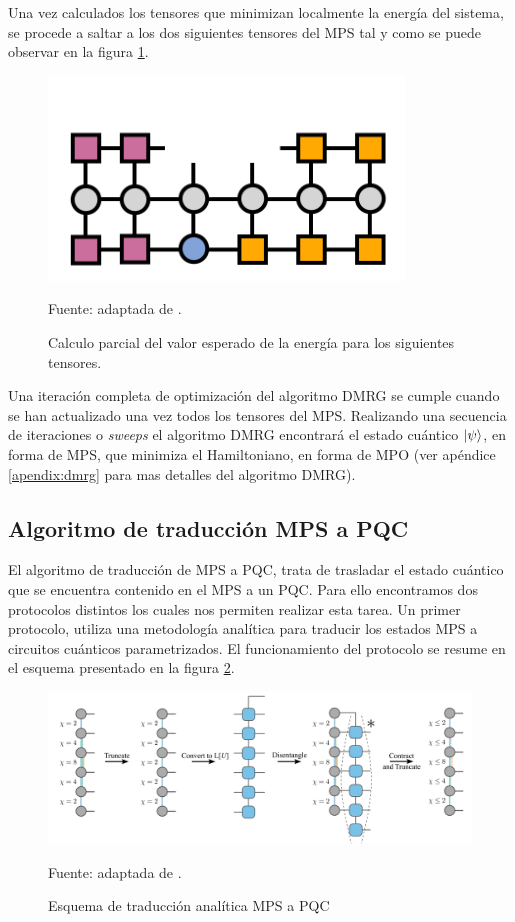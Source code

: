 Una vez calculados los tensores que minimizan localmente la energía del sistema, se procede a saltar a los dos siguientes tensores del MPS tal y como se puede observar en la figura \ref{fig:mpo_mps_2}.

\begin{figure}[!h]
    \centering
    \includegraphics[scale = 0.8]{img/05-dmrg_mpo_mps_2.png}
    \caption{Calculo parcial del valor esperado de la energía para los siguientes tensores.}
    Fuente: adaptada de \citep{tn}.
    \label{fig:mpo_mps_2}
\end{figure}

Una iteración completa de optimización del algoritmo DMRG se cumple cuando se han actualizado una vez todos los tensores del MPS. Realizando una secuencia de iteraciones o \textit{sweeps} el algoritmo DMRG encontrará el estado cuántico $\ket{\psi}$, en forma de MPS, que minimiza el Hamiltoniano, en forma de MPO (ver apéndice \ref{apendix:dmrg} para mas detalles del algoritmo DMRG).

\subsection{Algoritmo de traducción MPS a PQC}
\label{sub_sec:mps_to_pqc}

El algoritmo de traducción de MPS a PQC, trata de trasladar el estado cuántico que se encuentra contenido en el MPS a un PQC. Para ello encontramos dos protocolos distintos los cuales nos permiten realizar esta tarea. Un primer protocolo, \citep{ran} utiliza una metodología analítica para traducir los estados MPS a circuitos cuánticos parametrizados. El funcionamiento del protocolo se resume en el esquema presentado en la figura \ref{fig:mps_to_pqc_a}.

\begin{figure}[!h]
    \centering
    \includegraphics[scale = 0.6]{img/05-mps_to_pqc_a.png}
    \caption{Esquema de traducción analítica MPS a PQC}
    Fuente: adaptada de \citep{rudolph}.
    \label{fig:mps_to_pqc_a}
\end{figure}

